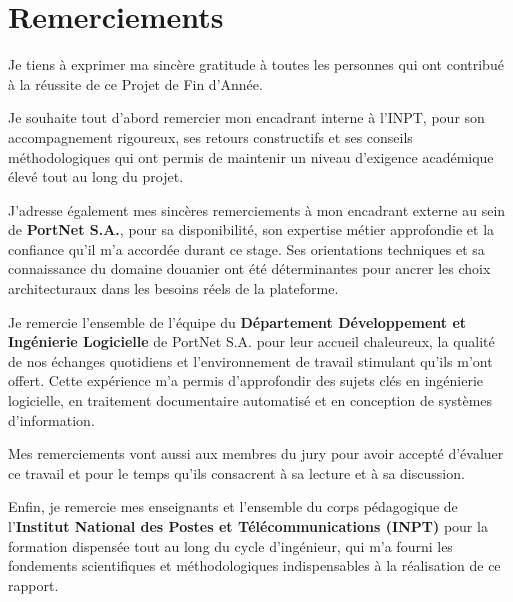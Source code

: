 \chapter*{Remerciements}

Je tiens \`{a} exprimer ma sinc\`{e}re gratitude \`{a} toutes les personnes qui ont contribu\'{e} \`{a} la r\'{e}ussite de ce Projet de Fin d'Ann\'{e}e.

Je souhaite tout d'abord remercier mon encadrant interne \`{a} l'INPT, pour son accompagnement rigoureux, ses retours constructifs et ses conseils m\'{e}thodologiques qui ont permis de maintenir un niveau d'exigence acad\'{e}mique \'{e}lev\'{e} tout au long du projet.

J'adresse \'{e}galement mes sinc\`{e}res remerciements \`{a} mon encadrant externe au sein de \textbf{PortNet S.A.}, pour sa disponibilit\'{e}, son expertise m\'{e}tier approfondie et la confiance qu'il m'a accord\'{e}e durant ce stage. Ses orientations techniques et sa connaissance du domaine douanier ont \'{e}t\'{e} d\'{e}terminantes pour ancrer les choix architecturaux dans les besoins r\'{e}els de la plateforme.

Je remercie l'ensemble de l'\'{e}quipe du \textbf{D\'{e}partement D\'{e}veloppement et Ing\'{e}nierie Logicielle} de PortNet S.A. pour leur accueil chaleureux, la qualit\'{e} de nos \'{e}changes quotidiens et l'environnement de travail stimulant qu'ils m'ont offert. Cette exp\'{e}rience m'a permis d'approfondir des sujets cl\'{e}s en ing\'{e}nierie logicielle, en traitement documentaire automatis\'{e} et en conception de syst\`{e}mes d'information.

Mes remerciements vont aussi aux membres du jury pour avoir accept\'{e} d'\'{e}valuer ce travail et pour le temps qu'ils consacrent \`{a} sa lecture et \`{a} sa discussion.

Enfin, je remercie mes enseignants et l'ensemble du corps p\'{e}dagogique de l'\textbf{Institut National des Postes et T\'{e}l\'{e}communications (INPT)} pour la formation dispens\'{e}e tout au long du cycle d'ing\'{e}nieur, qui m'a fourni les fondements scientifiques et m\'{e}thodologiques indispensables \`{a} la r\'{e}alisation de ce rapport.
